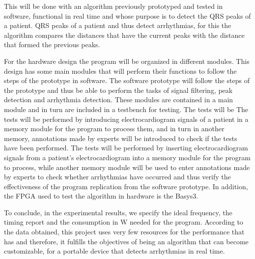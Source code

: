     This will be done with an algorithm previously prototyped and tested in software, functional in real time and whose purpose is to detect the QRS peaks of a patient.
    QRS peaks of a patient and thus detect arrhythmias, for this the algorithm compares the distances that have the current peaks with the distance that formed the previous peaks.
    
    For the hardware design the program will be organized in different modules. This design has some main modules that will perform their functions to follow the steps of the prototype in software. 
    The software prototype will follow the steps of the prototype and thus be able to perform the tasks of signal filtering, peak detection and arrhythmia detection.
    These modules are contained in a main module and in turn are included in a testbench for testing. The tests will be 
    The tests will be performed by introducing electrocardiogram signals of a patient in a memory module for the program to process them, and in turn in another memory, annotations made by experts will be introduced to check if the tests have been performed. 
    The tests will be performed by inserting electrocardiogram signals from a patient's electrocardiogram into a memory module for the program to process, while another memory module will be used to enter annotations made by experts to check whether arrhythmias have occurred and thus verify the effectiveness of the program replication from the software prototype.  In addition, the FPGA 
    used to test the algorithm in hardware is the Basys3.
    
    To conclude, in the experimental results, we specify the ideal frequency, the timing report and the 
    consumption in W needed for the program. According to the data obtained, this project uses very few resources for the performance that has 
    and therefore, it fulfills the objectives of being an algorithm that can become customizable, for a portable device that detects arrhythmias in real time.